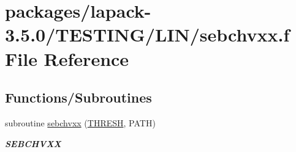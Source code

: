 \hypertarget{sebchvxx_8f}{}\section{packages/lapack-\/3.5.0/\+T\+E\+S\+T\+I\+N\+G/\+L\+I\+N/sebchvxx.f File Reference}
\label{sebchvxx_8f}
\subsection*{Functions/\+Subroutines}
\begin{DoxyCompactItemize}
\item 
subroutine \hyperlink{group__single__lin_ga8b9d52c28582eb5ba9ff59f530fb9714}{sebchvxx} (\hyperlink{zlaqgs_8c_a0656018abfc9fa2821827415f5d5ea57}{T\+H\+R\+E\+S\+H}, P\+A\+T\+H)
\begin{DoxyCompactList}\small\item\em {\bfseries S\+E\+B\+C\+H\+V\+X\+X} \end{DoxyCompactList}\end{DoxyCompactItemize}

